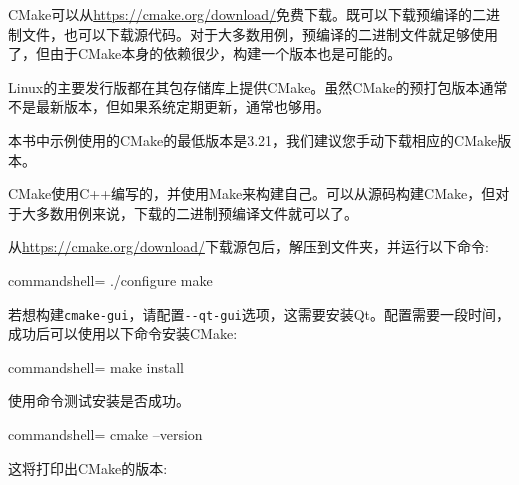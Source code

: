 CMake可以从\url{https://cmake.org/download/}免费下载。既可以下载预编译的二进制文件，也可以下载源代码。对于大多数用例，预编译的二进制文件就足够使用了，但由于CMake本身的依赖很少，构建一个版本也是可能的。

Linux的主要发行版都在其包存储库上提供CMake。虽然CMake的预打包版本通常不是最新版本，但如果系统定期更新，通常也够用。

\begin{tcolorbox}[colback=webgreen!5!white,colframe=webgreen!75!black,title=Note]
本书中示例使用的CMake的最低版本是3.21，我们建议您手动下载相应的CMake版本。
\end{tcolorbox}


CMake使用C++编写的，并使用Make来构建自己。可以从源码构建CMake，但对于大多数用例来说，下载的二进制预编译文件就可以了。

从\url{https://cmake.org/download/}下载源包后，解压到文件夹，并运行以下命令:

\begin{tcblisting}{commandshell={}}
./configure make
\end{tcblisting}

若想构建\texttt{cmake-gui}，请配置\texttt{-{}-qt-gui}选项，这需要安装Qt。配置需要一段时间，成功后可以使用以下命令安装CMake:

\begin{tcblisting}{commandshell={}}
make install
\end{tcblisting}

使用命令测试安装是否成功。

\begin{tcblisting}{commandshell={}}
cmake --version
\end{tcblisting}

这将打印出CMake的版本:


